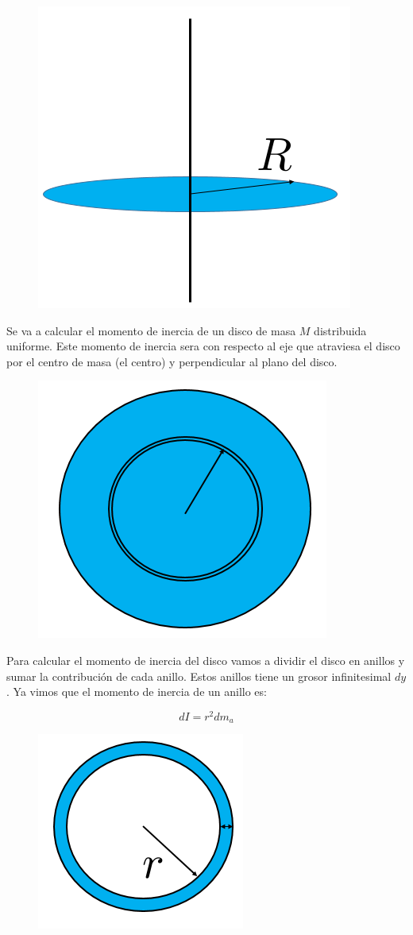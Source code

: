 \documentclass[a4paper,11pt]{article}
\theoremstyle{mytheor}
\begin{document}
\begin{figure}[h]
	\includegraphics[width=0.5\linewidth]{disc1}
	\label{fcN4}
\end{figure}

Se va a calcular el momento de inercia de un disco de masa $M$ distribuida uniforme. Este momento de inercia sera con respecto al eje que atraviesa el disco por el centro de masa (el centro) y perpendicular al plano del disco.


\begin{figure}[h]
	\includegraphics[width=0.5\linewidth]{disc2}
	\label{fcN4}
\end{figure}


Para calcular el momento de inercia del disco vamos a dividir el disco en anillos y sumar la contribución de cada anillo. Estos anillos tiene un grosor infinitesimal $dy$. Ya vimos que el momento de inercia de un anillo es:

$$ dI =  r^2 dm_a $$


\begin{figure}[h]
	\includegraphics[width=0.5\linewidth]{disc3}
	\label{fcN4}
\end{figure}
\end{document}

